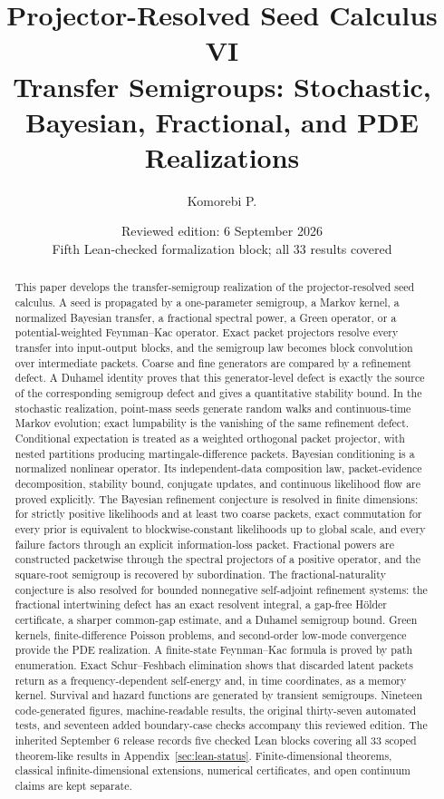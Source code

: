 \documentclass[11pt]{article}
\title{\textbf{Projector-Resolved Seed Calculus VI}\\[0.45em]
\large Transfer Semigroups: Stochastic, Bayesian, Fractional, and PDE Realizations}
\author{Komorebi P.}
\date{Reviewed edition: 6 September 2026\\\small Fifth Lean-checked formalization block; all 33 results covered}
\theoremstyle{definition}
\theoremstyle{remark}
\begin{document}
\maketitle

\begin{abstract}
This paper develops the transfer-semigroup realization of the projector-resolved seed calculus. A seed is propagated by a one-parameter semigroup, a Markov kernel, a normalized Bayesian transfer, a fractional spectral power, a Green operator, or a potential-weighted Feynman--Kac operator. Exact packet projectors resolve every transfer into input-output blocks, and the semigroup law becomes block convolution over intermediate packets. Coarse and fine generators are compared by a refinement defect. A Duhamel identity proves that this generator-level defect is exactly the source of the corresponding semigroup defect and gives a quantitative stability bound. In the stochastic realization, point-mass seeds generate random walks and continuous-time Markov evolution; exact lumpability is the vanishing of the same refinement defect. Conditional expectation is treated as a weighted orthogonal packet projector, with nested partitions producing martingale-difference packets. Bayesian conditioning is a normalized nonlinear operator. Its independent-data composition law, packet-evidence decomposition, stability bound, conjugate updates, and continuous likelihood flow are proved explicitly.  The Bayesian refinement conjecture is resolved in finite dimensions: for strictly positive likelihoods and at least two coarse packets, exact commutation for every prior is equivalent to blockwise-constant likelihoods up to global scale, and every failure factors through an explicit information-loss packet. Fractional powers are constructed packetwise through the spectral projectors of a positive operator, and the square-root semigroup is recovered by subordination. The fractional-naturality conjecture is also resolved for bounded nonnegative self-adjoint refinement systems: the fractional intertwining defect has an exact resolvent integral, a gap-free Hölder certificate, a sharper common-gap estimate, and a Duhamel semigroup bound. Green kernels, finite-difference Poisson problems, and second-order low-mode convergence provide the PDE realization. A finite-state Feynman--Kac formula is proved by path enumeration. Exact Schur--Feshbach elimination shows that discarded latent packets return as a frequency-dependent self-energy and, in time coordinates, as a memory kernel. Survival and hazard functions are generated by transient semigroups. Nineteen code-generated figures, machine-readable results, the original thirty-seven automated tests, and seventeen added boundary-case checks accompany this reviewed edition. The inherited September 6 release records five checked Lean blocks covering all 33 scoped theorem-like results in Appendix~\ref{sec:lean-status}. Finite-dimensional theorems, classical infinite-dimensional extensions, numerical certificates, and open continuum claims are kept separate.
\end{abstract}
\end{document}
